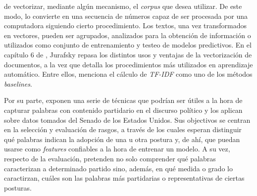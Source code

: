 de vectorizar, mediante alg\'un mecanismo, el \textit{corpus} que desea
utilizar.
De este modo, lo convierte en una secuencia de n\'umeros capaz de ser
procesada por una computadora siguiendo cierto procedimiento.
Los textos, una vez transformados en vectores, pueden ser agrupados, 
analizados para la obtenci\'on de informaci\'on o utilizados
como conjunto de entrenamiento y testeo de modelos predictivos.
En el cap\'itulo 6 de , Jurafsky
repasa los distintos usos y ventajas de la vectorizaci\'on de documentos, a la vez
que detalla los procedimientos m\'as utilizados en aprendizaje autom\'atico. Entre ellos,
menciona el c\'alculo de \textit{TF-IDF} como uno de los m\'etodos \textit{baselines}.
\par
Por su parte, \cite{monroe2008fightin} exponen una serie de t\'ecnicas
que podr\'ian ser \'utiles a la hora de capturar palabras con contenido partidario
en el discurso pol\'itico y los aplican sobre datos tomados del Senado de los Estados
Unidos. Sus objectivos se centran en la selecci\'on y evaluaci\'on de rasgos, a trav\'es
de los cuales esperan distinguir qu\'e palabras indican la adopci\'on de una u otra postura
y, de ah\'i, que puedan usarse como \textit{features} confiables a la hora de entrenar un
modelo. A su vez, respecto de la evaluaci\'on, pretenden no solo comprender qu\'e
palabras caracterizan a determinado partido sino, adem\'as, en qu\'e medida o grado
lo caractirzan, cu\'ales son las palabras m\'as partidarias o representativas de ciertas
posturas.
